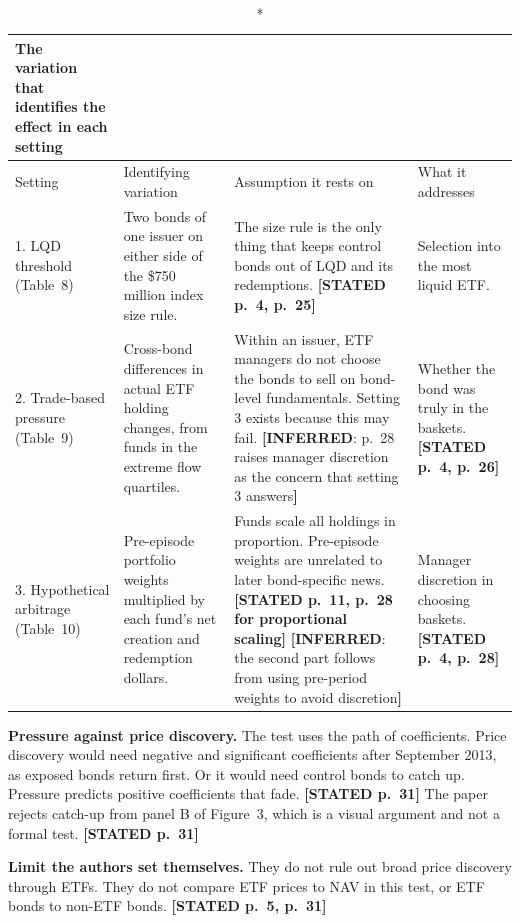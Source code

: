 \documentclass[10pt,a4paper]{article}
\newcommand{\ST}[1]{\textcolor{cst}{\textbf{[STATED #1]}}}
\newcommand{\IN}[1]{\textcolor{cin}{\textbf{[INFERRED}: #1\textbf{]}}}
\begin{document}
\begin{longtable}{@{}P{2.2cm}P{4.7cm}P{5.5cm}P{4.1cm}@{}}
\caption*{\textbf{The variation that identifies the effect in each setting}}\\
\toprule
Setting & Identifying variation & Assumption it rests on & What it addresses\\
\midrule{}. LQD threshold (Table~8) & Two bonds of one issuer on either side of the \$750 million index size rule. & The size rule is the only thing that keeps control bonds out of LQD and its redemptions. \ST{p.~4, p.~25} & Selection into the most liquid ETF.\\
2. Trade-based pressure (Table~9) & Cross-bond differences in actual ETF holding changes, from funds in the extreme flow quartiles. & Within an issuer, ETF managers do not choose the bonds to sell on bond-level fundamentals. Setting 3 exists because this may fail. \IN{p.~28 raises manager discretion as the concern that setting 3 answers} & Whether the bond was truly in the baskets. \ST{p.~4, p.~26}\\
3. Hypothetical arbitrage (Table~10) & Pre-episode portfolio weights multiplied by each fund's net creation and redemption dollars. & Funds scale all holdings in proportion. Pre-episode weights are unrelated to later bond-specific news. \ST{p.~11, p.~28 for proportional scaling} \IN{the second part follows from using pre-period weights to avoid discretion} & Manager discretion in choosing baskets. \ST{p.~4, p.~28}\\
\bottomrule
\end{longtable}

\textbf{Pressure against price discovery.} The test uses the path of coefficients. Price discovery would need negative and significant coefficients after September 2013, as exposed bonds return first. Or it would need control bonds to catch up. Pressure predicts positive coefficients that fade. \ST{p.~31} The paper rejects catch-up from panel B of Figure~3, which is a visual argument and not a formal test. \ST{p.~31}

\textbf{Limit the authors set themselves.} They do not rule out broad price discovery through ETFs. They do not compare ETF prices to NAV in this test, or ETF bonds to non-ETF bonds. \ST{p.~5, p.~31}
\end{document}
